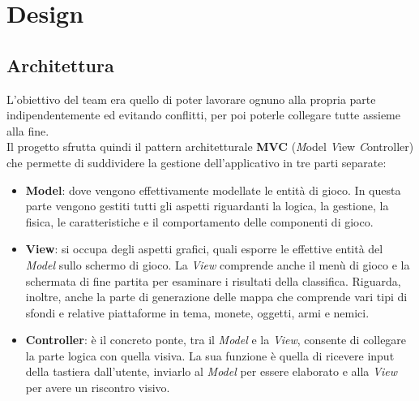 
\chapter{Design}

\section{Architettura}

\textsf{\small L'obiettivo del team era quello di poter lavorare ognuno alla propria parte indipendentemente ed evitando conflitti, per poi poterle collegare tutte assieme alla fine.}\\

\textsf{\small Il progetto sfrutta quindi il pattern architetturale \textbf{MVC} (\emph{M}odel \emph{V}iew \emph{C}ontroller) che permette di suddividere la gestione dell'applicativo in tre parti separate: }\\

\begin{itemize} %
	\item \textsf{\small \textbf{Model}: dove vengono effettivamente modellate le entità di gioco. In questa parte vengono gestiti tutti gli aspetti riguardanti la logica, la gestione, la fisica, le caratteristiche e il comportamento delle componenti di gioco.}
	\item \textsf{\small \textbf{View}: si occupa degli aspetti grafici, quali esporre le effettive entità del \emph{Model} sullo schermo di gioco. La \emph{View} comprende anche il menù di gioco e la schermata di fine partita per esaminare i risultati della classifica. Riguarda, inoltre, anche la parte di generazione delle mappa che comprende vari tipi di sfondi e relative piattaforme in tema, monete, oggetti, armi e nemici.}
	\item \textsf{\small \textbf{Controller}: è il concreto ponte, tra il \emph{Model} e la \emph{View}, consente di collegare la parte logica con quella visiva. La sua funzione è quella di ricevere input della tastiera dall'utente, inviarlo al \emph{Model} per essere elaborato e alla \emph{View} per avere un riscontro visivo.}
\end{itemize}

